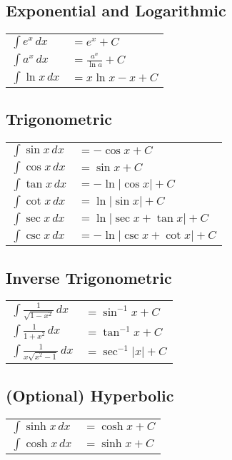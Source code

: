 \documentclass[12pt]{article}
\begin{document}
\vspace{1em}
\subsection*{Exponential and Logarithmic}
\begin{tabular}{@{}ll@{}}
\toprule
$\displaystyle \int e^x\,dx$ & $= e^x + C$ \\
$\displaystyle \int a^x\,dx$ & $= \frac{a^x}{\ln a} + C$ \\
$\displaystyle \int \ln x\,dx$ & $= x\ln x - x + C$ \\
\bottomrule
\end{tabular}

\vspace{1em}
\subsection*{Trigonometric}
\begin{tabular}{@{}ll@{}}
\toprule
$\displaystyle \int \sin x\,dx$ & $= -\cos x + C$ \\
$\displaystyle \int \cos x\,dx$ & $= \sin x + C$ \\
$\displaystyle \int \tan x\,dx$ & $= -\ln|\cos x| + C$ \\
$\displaystyle \int \cot x\,dx$ & $= \ln|\sin x| + C$ \\
$\displaystyle \int \sec x\,dx$ & $= \ln|\sec x + \tan x| + C$ \\
$\displaystyle \int \csc x\,dx$ & $= -\ln|\csc x + \cot x| + C$ \\
\bottomrule
\end{tabular}

\vspace{1em}
\subsection*{Inverse Trigonometric}
\begin{tabular}{@{}ll@{}}
\toprule
$\displaystyle \int \frac{1}{\sqrt{1 - x^2}}\,dx$ & $= \sin^{-1}x + C$ \\
$\displaystyle \int \frac{1}{1 + x^2}\,dx$ & $= \tan^{-1}x + C$ \\
$\displaystyle \int \frac{1}{x\sqrt{x^2 - 1}}\,dx$ & $= \sec^{-1}|x| + C$ \\
\bottomrule
\end{tabular}

\vspace{1em}
\subsection*{(Optional) Hyperbolic}
\begin{tabular}{@{}ll@{}}
\toprule
$\displaystyle \int \sinh x\,dx$ & $= \cosh x + C$ \\
$\displaystyle \int \cosh x\,dx$ & $= \sinh x + C$ \\
\bottomrule
\end{tabular}
\end{document}
